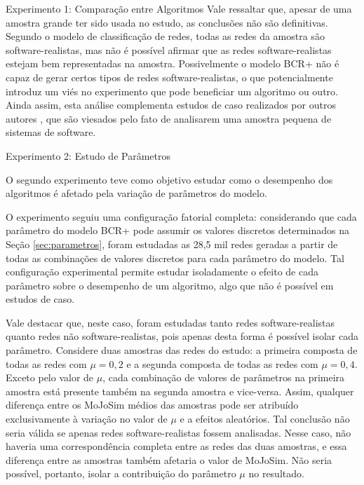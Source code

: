 \begin{section}{Experimento 1: Comparação entre Algoritmos}
Vale ressaltar que, apesar de uma amostra grande ter sido usada no estudo, as conclusões não são definitivas. Segundo o modelo de classificação de redes, todas as redes da amostra são software-realistas, mas não é possível afirmar que as redes software-realistas estejam bem representadas na amostra. Possivelmente o modelo BCR+ não é capaz de gerar certos tipos de redes software-realistas, o que potencialmente introduz um viés no experimento que pode beneficiar um algoritmo ou outro. Ainda assim, esta análise complementa estudos de caso realizados por outros autores \cite{Wu2005,Andritsos2005}, que são viesados pelo fato de analisarem uma amostra pequena de sistemas de software.

\end{section}

\begin{section}{Experimento 2: Estudo de Parâmetros}

O segundo experimento teve como objetivo estudar como o desempenho dos algoritmos é afetado pela variação de parâmetros do modelo. 

O experimento seguiu uma configuração fatorial completa: considerando que cada parâmetro do modelo BCR+ pode assumir os valores discretos determinados na Seção \ref{sec:parametros}, foram estudadas as 28,5 mil redes geradas a partir de todas as combinações de valores discretos para cada parâmetro do modelo. Tal configuração experimental permite estudar isoladamente o efeito de cada parâmetro sobre o desempenho de um algoritmo, algo que não é possível em estudos de caso.

Vale destacar que, neste caso, foram estudadas tanto redes software-realistas quanto redes não software-realistas, pois apenas desta forma é possível isolar cada parâmetro. Considere duas amostras das redes do estudo: a primeira composta de todas as redes com $\mu = 0,2$ e a segunda composta de todas as redes com $\mu = 0,4$. Exceto pelo valor de $\mu$, cada combinação de valores de parâmetros na primeira amostra está presente também na segunda amostra e vice-versa. Assim, qualquer diferença entre os MoJoSim médios das amostras pode ser atribuído exclusivamente à variação no valor de $\mu$ e a efeitos aleatórios. Tal conclusão não seria válida se apenas redes software-realistas fossem analisadas. Nesse caso, não haveria uma correspondência completa entre as redes das duas amostras, e essa diferença entre as amostras também afetaria o valor de MoJoSim. Não seria possível, portanto, isolar a contribuição do parâmetro $\mu$ no resultado.


\end{section}
